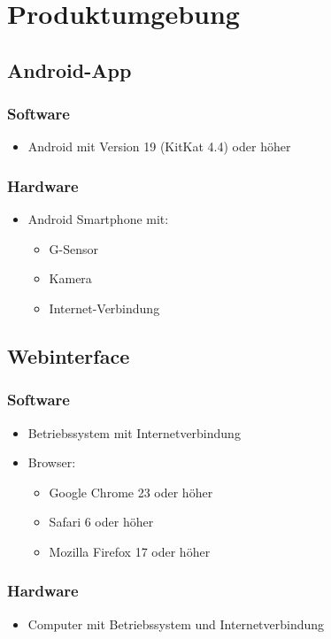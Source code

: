\chapter{Produktumgebung}
\section{Android-App}
\subsection{Software}
\begin{itemize} 
\item Android mit Version 19 (KitKat 4.4) oder h\"oher
\end{itemize}
\subsection{Hardware}
\begin{itemize} 
	\item Android Smartphone mit:
	\begin{itemize}
		\item G-Sensor 
		\item Kamera
		\item Internet-Verbindung
	\end{itemize}
\end{itemize}

\section{Webinterface}
\subsection{Software}
\begin{itemize} 
\item Betriebssystem mit Internetverbindung
\item Browser:
	\begin{itemize}
		\item Google Chrome 23 oder h\"oher
		\item Safari 6 oder h\"oher
		\item Mozilla Firefox 17 oder h\"oher
	\end{itemize}
\end{itemize}
\subsection{Hardware}
\begin{itemize} 
\item Computer mit Betriebssystem und Internetverbindung
\end{itemize}

